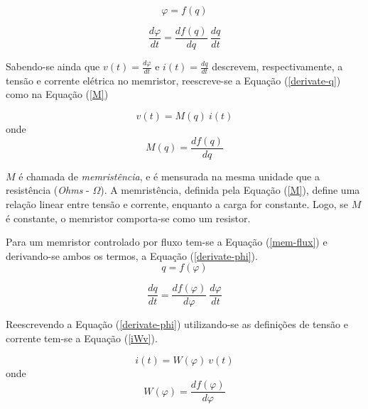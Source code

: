 \documentclass{ceel}
\begin{document}
\begin{multicols}{2}
\begin{equation}\label{mem-charge}
\varphi = f(q)
\end{equation}

\begin{equation}\label{derivate-q}
\dfrac{d\varphi}{dt}=\dfrac{df(q)}{dq} \ \dfrac{dq}{dt}
\end{equation}
\vspace{0.1cm}

Sabendo-se ainda que $v(t)=\frac{d\varphi}{dt}$ e $i(t)=\frac{dq}{dt}$ descrevem, respectivamente, a tensão e corrente elétrica no memristor, 
reescreve-se a Equação (\ref{derivate-q}) como na Equação (\ref{M}) 

\begin{equation}\label{vMi}
v(t)=M(q)\ i(t)
\end{equation}
\noindent onde
\begin{equation} \label{M}
M(q) =\dfrac{df(q)}{dq}
\end{equation}
\vspace{0.02cm}

$M$ é chamada de \textit{memristência}, e é mensurada na mesma unidade que a resistência (\textit{Ohms} - $\Omega$). A memristência, definida pela Equação (\ref{M}), define uma relação linear entre tensão e corrente, enquanto a carga for constante. Logo, se $M$ é constante, o memristor comporta-se como um resistor.

Para um memristor controlado por fluxo tem-se a Equação (\ref{mem-flux}) e derivando-se ambos os termos, a Equação (\ref{derivate-phi}).
\begin{equation}\label{mem-flux}
q = f(\varphi)
\end{equation}

\begin{equation}\label{derivate-phi}
\dfrac{dq}{dt}=\dfrac{df(\varphi)}{d\varphi} \ \dfrac{d\varphi}{dt}
\end{equation}
\vspace{0.04cm}

Reescrevendo a Equação (\ref{derivate-phi}) utilizando-se as definições de tensão e corrente tem-se a  Equação (\ref{iWv}).

\begin{equation}\label{iWv}
i(t)=W(\varphi)\ v(t)
\end{equation}
\noindent onde
\begin{equation} \label{W}
W(\varphi) =\dfrac{df(\varphi)}{d\varphi}
\end{equation}


\end{multicols}
\end{document}
